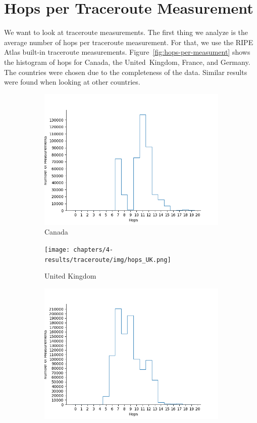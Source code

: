 \section{Hops per Traceroute Measurement}

We want to look at traceroute measurements. The first thing we analyze is the
average number of hops per traceroute measurement. For that, we use the RIPE
Atlas built-in traceroute measurements. Figure~\ref{fig:hops-per-measument}
shows the histogram of hops for Canada, the United~Kingdom, France, and
Germany. The countries were chosen due to the completeness of the data. Similar
results were found when looking at other countries.

\begin{figure}
	\centering
	\begin{subfigure}[b]{\linewidth}
		\includegraphics[width=\linewidth]{chapters/4-results/traceroute/img/hops_CA.png}
		\caption{Canada}
	\end{subfigure}
	\begin{subfigure}[b]{\linewidth}
		\texttt{[image: chapters/4-results/traceroute/img/hops\_UK.png]}
		\caption{United Kingdom}
	\end{subfigure}
	\begin{subfigure}[b]{\linewidth}
		\includegraphics[width=\linewidth]{chapters/4-results/traceroute/img/hops_FR.png}

\end{subfigure}
\end{figure}
